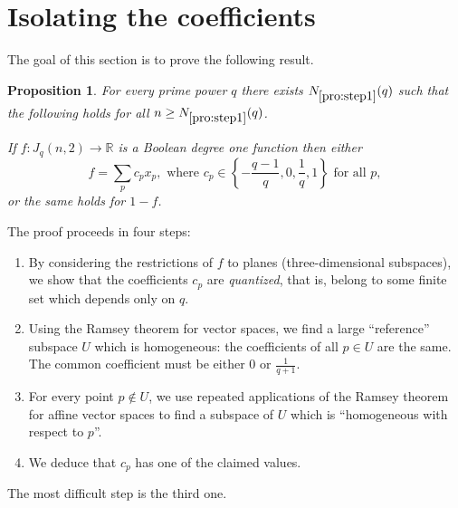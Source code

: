 \documentclass{article}
\newtheorem{proposition}[theorem]{Proposition}
\theoremstyle{definition}
\providecommand{\FF}{\mathbb{F}}
\providecommand{\RR}{\mathbb{R}}
\providecommand{\Nlist}{N_{\ref{pro:step1}}}
\begin{document}
\section{Isolating the coefficients}
\label{sec:coeffs}

The goal of this section is to prove the following result.

\begin{proposition} \label{pro:step1}
For every prime power $q$ there exists $\Nlist(q)$ such that the following holds for all $n \ge \Nlist(q)$.

If $f\colon J_q(n,2) \to \RR$ is a Boolean degree one function then either
\[
 f = \sum_p c_p x_p, \text{ where } c_p \in \left\{-\frac{q-1}{q}, 0, \frac{1}{q}, 1 \right\} \text{ for all } p,
\]
or the same holds for $1 - f$.
\end{proposition}

The proof proceeds in four steps:
\begin{enumerate}
\item By considering the restrictions of $f$ to planes (three-dimensional subspaces), we show that the coefficients $c_p$ are \emph{quantized}, that is, belong to some finite set which depends only on $q$.
\item Using the Ramsey theorem for vector spaces, we find a large ``reference'' subspace $U$ which is homogeneous: the coefficients of all $p \in U$ are the same. The common coefficient must be either $0$ or $\frac{1}{q+1}$. %
\item For every point $p \notin U$, we use repeated applications of the Ramsey theorem for affine vector spaces to find a subspace of $U$ which is ``homogeneous with respect to $p$''.
\item We deduce that $c_p$ has one of the claimed values.
\end{enumerate}
The most difficult step is the third one.

\end{document}
